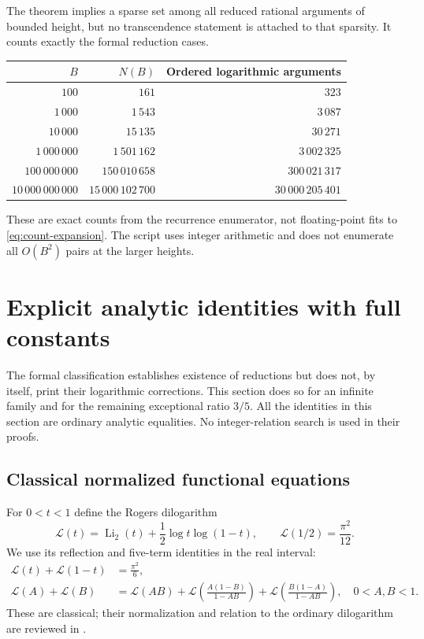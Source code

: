 \documentclass[11pt]{article}
\numberwithin{equation}{section}
\theoremstyle{definition}
\theoremstyle{remark}
\newcommand{\Rog}{\mathcal L}
\DeclareMathOperator{\Li}{Li}
\begin{document}
The theorem implies a sparse set among all reduced rational arguments
of bounded height, but no transcendence statement is attached to that
sparsity. It counts exactly the formal reduction cases.

\begin{center}
\begin{tabular}{r r r}
\toprule
$B$ & $N(B)$ & Ordered logarithmic arguments\\
\midrule
$100$ & $161$ & $323$\\
$1\,000$ & $1\,543$ & $3\,087$\\
$10\,000$ & $15\,135$ & $30\,271$\\
$1\,000\,000$ & $1\,501\,162$ & $3\,002\,325$\\
$100\,000\,000$ & $150\,010\,658$ & $300\,021\,317$\\
$10\,000\,000\,000$ & $15\,000\,102\,700$ & $30\,000\,205\,401$\\
\bottomrule
\end{tabular}
\end{center}
These are exact counts from the recurrence enumerator, not floating-point
fits to \eqref{eq:count-expansion}. The script uses integer arithmetic
and does not enumerate all $O(B^2)$ pairs at the larger heights.


\section{Explicit analytic identities with full constants}
\label{sec:identities}

The formal classification establishes existence of reductions but does
not, by itself, print their logarithmic corrections. This section does
so for an infinite family and for the remaining exceptional ratio
$3/5$. All the identities in this section are ordinary analytic
equalities. No integer-relation search is used in their proofs.

\subsection{Classical normalized functional equations}

For $0<t<1$ define the Rogers dilogarithm
\begin{equation}\label{eq:Rogers}
 \Rog(t)=\Li_2(t)+\frac12\log t\log(1-t),
 \qquad \Rog(1/2)=\frac{\pi^2}{12}.
\end{equation}
We use its reflection and five-term identities in the real interval:
\begin{align}
 \Rog(t)+\Rog(1-t)&=\frac{\pi^2}{6},\label{eq:Rog-reflect}\\
 \Rog(A)+\Rog(B)&=\Rog(AB)
  +\Rog\left(\frac{A(1-B)}{1-AB}\right)
  +\Rog\left(\frac{B(1-A)}{1-AB}\right),
 \quad 0<A,B<1.\label{eq:Rog-five}
\end{align}
These are classical; their normalization and relation to the ordinary
dilogarithm are reviewed in \cite{ZagierDilog,RZ}.
\end{document}
